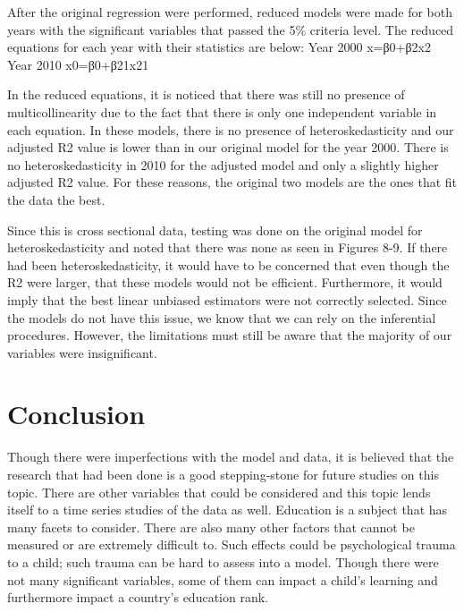 \documentclass{article}
\begin{document}
After the original regression were performed, reduced models were made for both years with the significant variables that passed the 5\% criteria level. The reduced equations for each year with their statistics are below: 
    Year 2000
x=β0+β2x2
				     Year 2010
x0=β0+β21x21

In the reduced equations, it is noticed that there was still no presence of multicollinearity due to the fact that there is only one independent variable in each equation. In these models, there is no presence of heteroskedasticity and our adjusted R2 value is lower than in our original model for the year 2000. There is no heteroskedasticity in 2010 for the adjusted model and only a slightly higher adjusted R2 value. For these reasons, the original two models are the ones that fit the data the best.

Since this is cross sectional data, testing was done on the original model for heteroskedasticity and noted that there was none as seen in Figures 8-9. If there had been heteroskedasticity, it would have to be concerned that even though the R2 were larger, that these models would not be efficient. Furthermore, it would imply that the best linear unbiased estimators were not correctly selected. Since the models do not have this issue, we know that we can rely on the inferential procedures. However, the limitations must still be aware that the majority of our variables were insignificant. 

\section{Conclusion}
Though there were imperfections with the model and data, it is believed that the research that had been done is a good stepping-stone for future studies on this topic. There are other variables that could be considered and this topic lends itself to a time series studies of the data as well. Education is a subject that has many facets to consider. There are also many other factors that cannot be measured or are extremely difficult to. Such effects could be psychological trauma to a child; such trauma can be hard to assess into a model. Though there were not many significant variables, some of them can impact a child’s learning and furthermore impact a country’s education rank. 
\newpage


\nocite{*}

\end{document}
